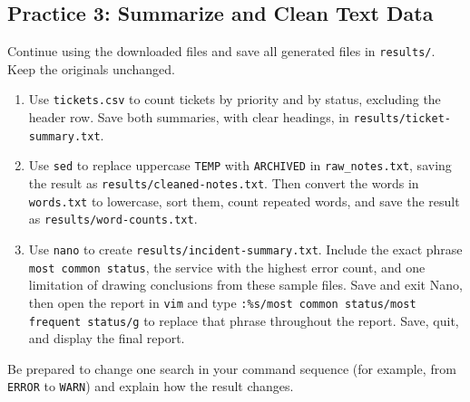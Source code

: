 \subsection{Practice 3: Summarize and Clean Text Data}
Continue using the downloaded files and save all generated files in \texttt{results/}. Keep the originals unchanged.
\begin{enumerate}
    \item Use \texttt{tickets.csv} to count tickets by priority and by status, excluding the header row. Save both summaries, with clear headings, in \texttt{results/ticket-summary.txt}.
    \item Use \texttt{sed} to replace uppercase \texttt{TEMP} with \texttt{ARCHIVED} in \texttt{raw\_notes.txt}, saving the result as \texttt{results/cleaned-notes.txt}. Then convert the words in \texttt{words.txt} to lowercase, sort them, count repeated words, and save the result as \texttt{results/word-counts.txt}.
    \item Use \texttt{nano} to create \texttt{results/incident-summary.txt}. Include the exact phrase \texttt{most common status}, the service with the highest error count, and one limitation of drawing conclusions from these sample files. Save and exit Nano, then open the report in \texttt{vim} and type \texttt{:\%s/most common status/most frequent status/g} to replace that phrase throughout the report. Save, quit, and display the final report.
\end{enumerate}

Be prepared to change one search in your command sequence (for example, from \texttt{ERROR} to \texttt{WARN}) and explain how the result changes.

